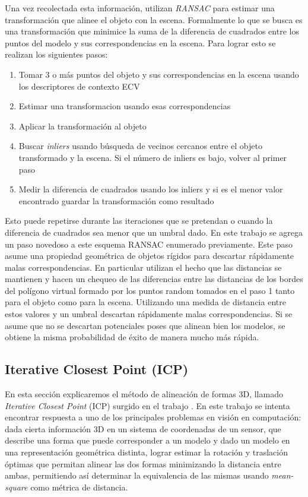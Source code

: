 Una vez recolectada esta información, utilizan \textit{RANSAC} para estimar una transformación que alinee el objeto con la escena. Formalmente lo que se busca es una transformación que minimice la suma de la diferencia de cuadrados entre los puntos del modelo y sus correspondencias en la escena. Para lograr esto se realizan los siguientes pasos:
\begin{enumerate}
	\item Tomar 3 o más puntos del objeto y sus correspondencias en la escena usando los descriptores de contexto ECV
	\item Estimar una transformacion usando esas correspondencias
	\item Aplicar la transformación al objeto
	\item Buscar \textit{inliers} usando búsqueda de vecinos cercanos entre el objeto transformado y la escena. Si el número de inliers es bajo, volver al primer paso
	\item Medir la diferencia de cuadrados usando los inliers y si es el menor valor encontrado guardar la transformación como resultado
\end{enumerate}

Esto puede repetirse durante las iteraciones que se pretendan o cuando la diferencia de cuadrados sea menor que un umbral dado. En este trabajo se agrega un paso novedoso a este esquema RANSAC enumerado previamente. Este paso asume una propiedad geométrica de objetos rígidos para descartar rápidamente malas correspondencias. En particular utilizan el hecho que las distancias se mantienen y hacen un chequeo de las diferencias entre las distancias de los bordes del polígono virtual formado por los puntos random tomados en el paso 1 tanto para el objeto como para la escena. Utilizando una medida de distancia entre estos valores y un umbral descartan rápidamente malas correspondencias. Si se asume que no se descartan potenciales poses que alinean bien los modelos, se obtiene la misma probabilidad de éxito de manera mucho más rápida.


\subsection{Iterative Closest Point (ICP)}\label{ICP}
En esta sección explicaremos el método de alineación de formas 3D, llamado \textit{Iterative Closest Point} (ICP) surgido en el trabajo \cite{besl1992method}. En este trabajo se intenta encontrar respuesta a uno de los principales problemas en visión en computación: dada cierta información 3D en un sistema de coordenadas de un sensor, que describe una forma que puede corresponder a un modelo y dado un modelo en una representación geométrica distinta, lograr estimar la rotación y traslación óptimas que permitan alinear las dos formas minimizando la distancia entre ambas, permitiendo así determinar la equivalencia de las mismas usando \textit{mean-square} como métrica de distancia.

